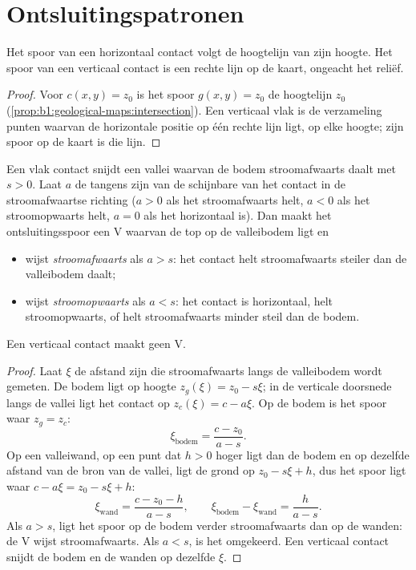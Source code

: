 \section{Ontsluitingspatronen}

\begin{proposition}\label{prop:b1:geological-maps:hv}
Het spoor van een horizontaal contact volgt de hoogtelijn van zijn hoogte. Het spoor van een
verticaal contact is een rechte lijn op de kaart, ongeacht het reliëf.
\end{proposition}

\begin{proof}
Voor $c(x,y) = z_0$ is het spoor $g(x,y) = z_0$ de hoogtelijn $z_0$
(\cref{prop:b1:geological-maps:intersection}). Een verticaal vlak is de verzameling
punten waarvan de horizontale positie op één rechte lijn ligt, op elke hoogte; zijn spoor op de
kaart is die lijn.
\end{proof}

\begin{theorem}[De V-regel]\label{thm:b1:geological-maps:v-rule}
Een vlak contact snijdt een vallei waarvan de bodem stroomafwaarts daalt met  $s > 0$. Laat $a$
de tangens zijn van de schijnbare  van het contact in de stroomafwaartse richting ($a > 0$ als
het stroomafwaarts helt, $a < 0$ als het stroomopwaarts helt, $a = 0$ als het horizontaal is). Dan maakt
het ontsluitingsspoor een V waarvan de top op de valleibodem ligt en
\begin{itemize}
  \item wijst \emph{stroomafwaarts} als $a > s$: het contact helt stroomafwaarts steiler dan de
        valleibodem daalt;
  \item wijst \emph{stroomopwaarts} als $a < s$: het contact is horizontaal, helt stroomopwaarts, of
        helt stroomafwaarts minder steil dan de bodem.
\end{itemize}
Een verticaal contact maakt geen V.
\end{theorem}

\begin{proof}
Laat $\xi$ de afstand zijn die stroomafwaarts langs de valleibodem wordt gemeten. De bodem ligt op
hoogte $z_g(\xi) = z_0 - s\xi$; in de verticale doorsnede langs de vallei ligt het contact op
$z_c(\xi) = c - a\xi$. Op de bodem is het spoor waar $z_g = z_c$:
\[
  \xi_{\text{bodem}} = \frac{c - z_0}{a - s}.
\]
Op een valleiwand, op een punt dat $h > 0$ hoger ligt dan de bodem en op dezelfde afstand van de
bron van de vallei, ligt de grond op $z_0 - s\xi + h$, dus het spoor ligt waar
$c - a\xi = z_0 - s\xi + h$:
\[
  \xi_{\text{wand}} = \frac{c - z_0 - h}{a - s}, \qquad
  \xi_{\text{bodem}} - \xi_{\text{wand}} = \frac{h}{a - s}.
\]
Als $a > s$, ligt het spoor op de bodem verder stroomafwaarts dan op de wanden: de V wijst
stroomafwaarts. Als $a < s$, is het omgekeerd. Een verticaal contact snijdt de bodem en de wanden
op dezelfde $\xi$.
\end{proof}


